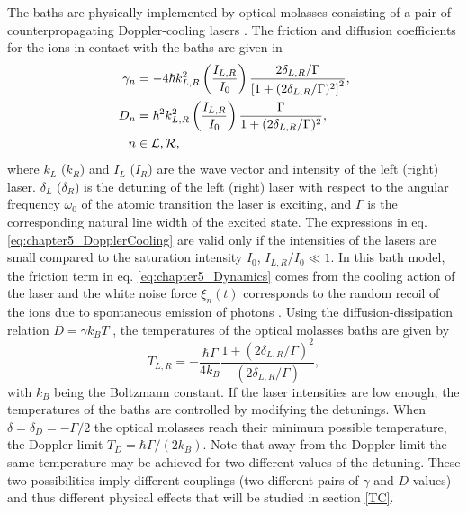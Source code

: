 The baths are physically implemented by optical molasses consisting of a pair of counterpropagating Doppler-cooling lasers \cite{Ruiz2014}. The friction and diffusion coefficients for the ions in contact with the baths are given in \cite{Cohen1992,Metcalf2003,Ruiz2014}
%
\begin{equation}
    \begin{split}
        \gamma_n &= -4 \hbar k_{L,R}^2 \left(\frac{I_{L,R}}{I_0}\right)\frac{2\delta_{L,R}/\Gamma}{\left[1 + (2\delta_{L,R}/\Gamma)^2\right]^2},\\
        D_n &= \hbar^2 k_{L,R}^2 \left(\frac{I_{L,R}}{I_0}\right) \frac{\Gamma}{1 + (2\delta_{L,R}/\Gamma)^2},\\
        n &\in \cal{L},\cal{R},
    \end{split}
    \label{eq:chapter5_DopplerCooling}
\end{equation}
%
where $k_L$ ($k_R$) and $I_L$ ($I_R$) are the wave vector and intensity of the left (right) laser. $\delta_L$ ($\delta_R$) is the detuning of the left (right) laser with respect to the angular frequency $\omega_0$ of the atomic transition the laser is exciting, and $\Gamma$ is the corresponding natural line width of the  excited state. The expressions in eq. \eqref{eq:chapter5_DopplerCooling} are valid only if the intensities of the lasers are small compared to the saturation intensity $I_0$, $I_{L,R}/I_0\ll 1$. In this bath model, the friction term in eq. \eqref{eq:chapter5_Dynamics} comes from the cooling action of the laser and the white noise force $\xi_n(t)$ corresponds to the random recoil of the ions due to spontaneous emission of photons \cite{Metcalf2003,Cohen1992}. Using the diffusion-dissipation relation $D = \gamma k_B T $ \cite{Chee2010}, the temperatures of the optical molasses baths are given by
%
\begin{equation}
    T_{L,R} = -\frac{\hbar \Gamma}{4 k_B} \frac{1+(2\delta_{L,R}/\Gamma)^2}{(2\delta_{L,R}/\Gamma)},
    \label{eq:chapter5_Doppler}
\end{equation}
%
with $k_B$ being the Boltzmann constant. If the laser intensities are low enough, the temperatures of the baths are controlled by modifying the detunings. When $\delta = \delta_D=-\Gamma / 2$ the optical molasses reach their minimum possible temperature, the Doppler limit $T_{D} = {\hbar \Gamma}/({2k_B})$. Note that away from the Doppler limit the same temperature may be achieved
for two different values of the detuning. These two possibilities imply different couplings (two different pairs of $\gamma$ and $D$ values) and thus different physical effects that will be studied in section \ref{TC}.
%
%
%
%
